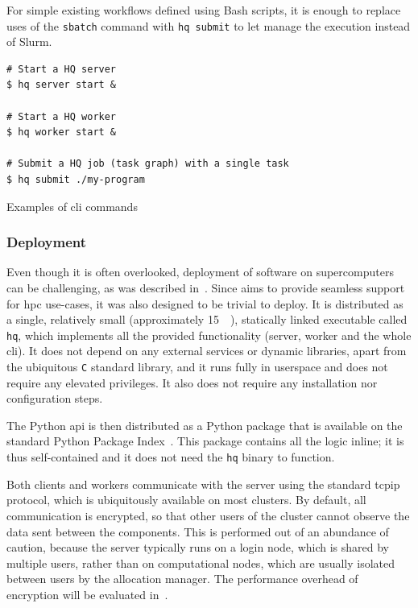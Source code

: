 For simple existing workflows defined using Bash scripts, it is enough to replace uses of the
\texttt{sbatch} command with \texttt{hq submit} to let \hyperqueue{} manage
the execution instead of Slurm.

\begin{listing}[h]
	\begin{verbatim}
# Start a HQ server
$ hq server start &

# Start a HQ worker
$ hq worker start &

# Submit a HQ job (task graph) with a single task
$ hq submit ./my-program
	\end{verbatim}
	\caption{Examples of \hyperqueue{} \acrshort{cli} commands}
	\label{lst:hq-cli-commands}
\end{listing}

\subsubsection*{Deployment}
Even though it is often overlooked, deployment of software on supercomputers can be challenging, as
was described in~. Since \hyperqueue{} aims to provide seamless
support for \gls{hpc} use-cases, it was also designed to be trivial to deploy. It is
distributed as a single, relatively small (approximately \SI{15}{\mebi\byte}), statically
linked executable called \texttt{hq}, which implements all the provided functionality
(server, worker and the whole \gls{cli}). It does not depend on any external services
or dynamic libraries, apart from the ubiquitous \texttt{C} standard library, and it
runs fully in userspace and does not require any elevated privileges. It also does not require any
installation nor configuration steps.

The \hyperqueue{} Python \gls{api} is then distributed as a Python package
that is available on the standard Python Package Index~\cite{hq_pypi}. This package
contains all the \hq{} logic inline; it is thus self-contained and it does not
need the \texttt{hq} binary to function.

Both clients and workers communicate with the server using the standard \gls{tcpip}
protocol, which is ubiquitously available on most clusters. By default, all communication is
encrypted, so that other users of the cluster cannot observe the data sent between the
\hyperqueue{} components. This is performed out of an abundance of caution, because the
server typically runs on a login node, which is shared by multiple users, rather than on
computational nodes, which are usually isolated between users by the allocation manager. The
performance overhead of encryption will be evaluated in~.

